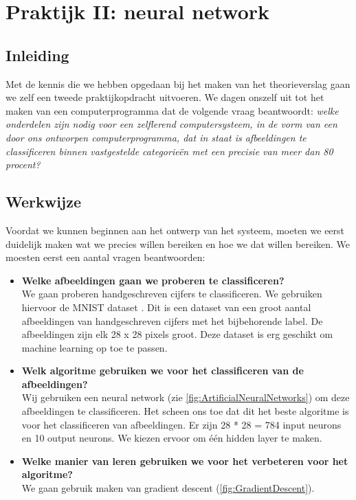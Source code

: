 \section{Praktijk II: neural network}

\subsection{Inleiding}
Met de kennis die we hebben opgedaan bij het maken van het theorieverslag gaan we zelf een tweede praktijkopdracht uitvoeren. We dagen onszelf uit tot het maken van een computerprogramma dat de volgende vraag beantwoordt: \textit{welke onderdelen zijn nodig voor een zelflerend computersysteem, in de vorm van een door ons ontworpen computerprogramma, dat in staat is afbeeldingen te classificeren binnen vastgestelde categorie\"en met een precisie van meer dan 80 procent?}

\subsection{Werkwijze}
Voordat we kunnen beginnen aan het ontwerp van het systeem, moeten we eerst duidelijk maken wat we precies willen bereiken en hoe we dat willen bereiken. We moesten eerst een aantal vragen beantwoorden:\\
\begin{itemize}  
\item\textbf{Welke afbeeldingen gaan we proberen te classificeren?}\\
We gaan proberen handgeschreven cijfers te classificeren. We gebruiken hiervoor de MNIST dataset \cite{MNIST}. Dit is een dataset van een groot aantal afbeeldingen van handgeschreven cijfers met het bijbehorende label. De afbeeldingen zijn elk 28 x 28 pixels groot. Deze dataset is erg geschikt om machine learning op toe te passen.
\item\textbf{Welk algoritme gebruiken we voor het classificeren van de afbeeldingen?}\\
Wij gebruiken een neural network (zie \ref{fig:ArtificialNeuralNetworks}) om deze afbeeldingen te classificeren. Het scheen ons toe dat dit het beste algoritme is voor het classificeren van afbeeldingen. Er zijn 28 * 28 = 784 input neurons en 10 output neurons. We kiezen ervoor om \'e\'en hidden layer te maken.
\item\textbf{Welke manier van leren gebruiken we voor het verbeteren voor het algoritme?}\\
We gaan gebruik maken van gradient descent (\ref{fig:GradientDescent}).
\end{itemize}

